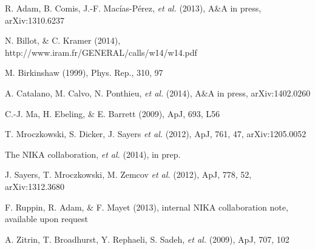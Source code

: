 \documentclass[11pt,a4paper,twoside,graphicx,color]{article}
\begin{document}
\begin{thebibliography}{9}

R. Adam, B. Comis, J.-F. Mac\'ias-P\'erez, {\it et al.} (2013), A\&A in press, arXiv:1310.6237
 
N. Billot, \& C. Kramer (2014), http://www.iram.fr/GENERAL/calls/w14/w14.pdf

M. Birkinshaw (1999), Phys. Rep., 310, 97

A. Catalano, M. Calvo, N. Ponthieu, {\it et al.} (2014), A\&A in press, arXiv:1402.0260

C.-J. Ma, H. Ebeling, \& E. Barrett (2009), ApJ, 693, L56

T. Mroczkowski, S. Dicker, J. Sayers {\it et al.} (2012), ApJ, 761, 47, arXiv:1205.0052

The NIKA collaboration, {\it et al.} (2014), in prep.
 
J. Sayers, T. Mroczkowski, M. Zemcov {\it et al.} (2012), ApJ, 778, 52, arXiv:1312.3680

F. Ruppin, R. Adam, \& F. Mayet (2013), internal NIKA collaboration note, available upon request
 
A. Zitrin, T. Broadhurst, Y. Rephaeli, S. Sadeh, {\it et al.} (2009), ApJ, 707, 102

\end{thebibliography}
\end{document}
